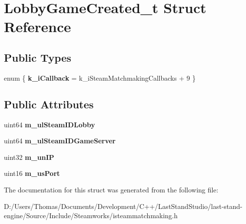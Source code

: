 \hypertarget{structLobbyGameCreated__t}{}\section{Lobby\+Game\+Created\+\_\+t Struct Reference}
\label{structLobbyGameCreated__t}
\subsection*{Public Types}
\begin{DoxyCompactItemize}
\item 
\hypertarget{structLobbyGameCreated__t_a07cbb7bdc35a1aacd9fb568574d0bf6a}{}enum \{ {\bfseries k\+\_\+i\+Callback} = k\+\_\+i\+Steam\+Matchmaking\+Callbacks + 9
 \}\label{structLobbyGameCreated__t_a07cbb7bdc35a1aacd9fb568574d0bf6a}

\end{DoxyCompactItemize}
\subsection*{Public Attributes}
\begin{DoxyCompactItemize}
\item 
\hypertarget{structLobbyGameCreated__t_afc3bd15a8c7de7b01a8de836f6c29f91}{}uint64 {\bfseries m\+\_\+ul\+Steam\+I\+D\+Lobby}\label{structLobbyGameCreated__t_afc3bd15a8c7de7b01a8de836f6c29f91}

\item 
\hypertarget{structLobbyGameCreated__t_afdc6cbfd4d8c64289292f09a35df156b}{}uint64 {\bfseries m\+\_\+ul\+Steam\+I\+D\+Game\+Server}\label{structLobbyGameCreated__t_afdc6cbfd4d8c64289292f09a35df156b}

\item 
\hypertarget{structLobbyGameCreated__t_a3cf6bea0d4c8cb3322739cb0e9989cae}{}uint32 {\bfseries m\+\_\+un\+I\+P}\label{structLobbyGameCreated__t_a3cf6bea0d4c8cb3322739cb0e9989cae}

\item 
\hypertarget{structLobbyGameCreated__t_a7f691ae0db62bb243f1bf4df0f48e02c}{}uint16 {\bfseries m\+\_\+us\+Port}\label{structLobbyGameCreated__t_a7f691ae0db62bb243f1bf4df0f48e02c}

\end{DoxyCompactItemize}


The documentation for this struct was generated from the following file\+:\begin{DoxyCompactItemize}
\item 
D\+:/\+Users/\+Thomas/\+Documents/\+Development/\+C++/\+Last\+Stand\+Studio/last-\/stand-\/engine/\+Source/\+Include/\+Steamworks/isteammatchmaking.\+h\end{DoxyCompactItemize}

